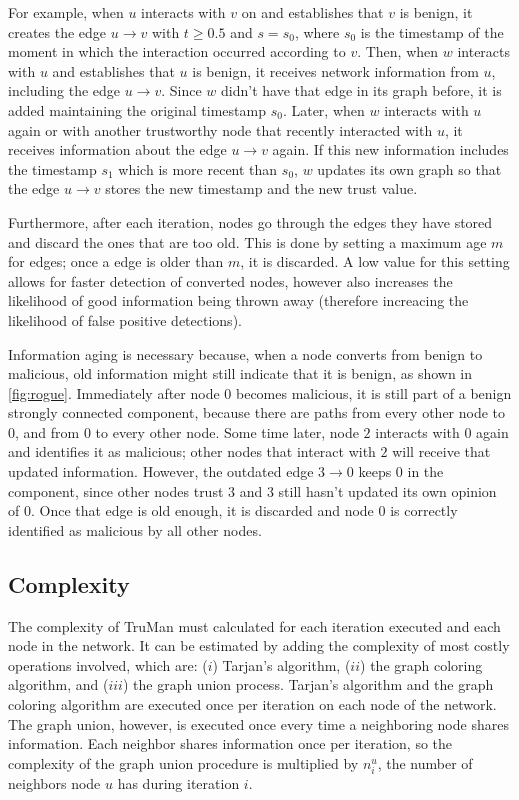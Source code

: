 For example, when $u$ interacts with $v$ on and establishes that $v$ is benign, it creates the edge $u \rightarrow v$ with $t \geq 0.5$ and $s = s_0$, where $s_0$ is the timestamp of the moment in which the interaction occurred according to $v$.
Then, when $w$ interacts with $u$ and establishes that $u$ is benign, it receives network information from $u$, including the edge $u\rightarrow v$.
Since $w$ didn't have that edge in its graph before, it is added maintaining the original timestamp $s_0$.
Later, when $w$ interacts with $u$ again or with another trustworthy node that recently interacted with $u$, it receives information about the edge $u\rightarrow v$ again.
If this new information includes the timestamp $s_1$ which is more recent than $s_0$, $w$ updates its own graph so that the edge $u\rightarrow v$ stores the new timestamp and the new trust value.

Furthermore, after each iteration, nodes go through the edges they have stored and discard the ones that are too old.
This is done by setting a maximum age $m$ for edges; once a edge is older than $m$, it is discarded.
A low value for this setting allows for faster detection of converted nodes, however  also increases the likelihood of good information being thrown away (therefore increacing the likelihood of false positive detections).

Information aging is necessary because, when a node converts from benign to malicious, old information might still indicate that it is benign, as shown in \autoref{fig:rogue}.
Immediately after node $0$ becomes malicious, it is still part of a benign strongly connected component, because there are paths from every other node to $0$, and from $0$ to every other node.
Some time later, node $2$ interacts with $0$ again and identifies it as malicious; other nodes that interact with $2$ will receive that updated information.
However, the outdated edge $3\rightarrow 0$ keeps $0$ in the component, since other nodes trust $3$ and $3$ still hasn't updated its own opinion of $0$.
Once that edge is old enough, it is discarded and node $0$ is correctly identified as malicious by all other nodes.

\subsection{Complexity}
The complexity of TruMan must calculated for each iteration executed and each node in the network.
It can be estimated by adding the complexity of most costly operations involved, which are: ($i$) Tarjan's algorithm, ($ii$) the graph coloring algorithm, and ($iii$) the graph union process.
Tarjan's algorithm and the graph coloring algorithm are executed once per iteration on each node of the network.
The graph union, however, is executed once every time a neighboring node shares information.
Each neighbor shares information once per iteration, so the complexity of the graph union procedure is multiplied by $n^u_i$, the number of neighbors node $u$ has during iteration $i$.

